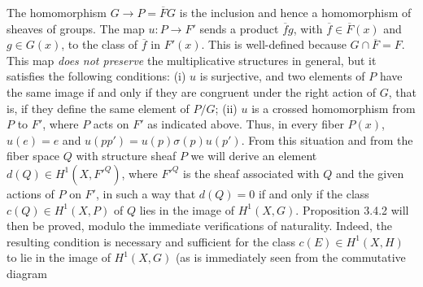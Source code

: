 The homomorphism $G\to P=\overline F G$ is the inclusion and
hence a homomorphism of sheaves of groups. The map
$u:P\to F'$ sends a product $\overline f g$, with
$\overline f\in\overline F(x)$ and $g\in G(x)$, to the class of $\overline f$
in $F'(x)$. This is well-defined because $G\cap\overline F=F$.
This map \textit{does not preserve} the multiplicative structures in general,
but it satisfies the following conditions: (i) $u$ is surjective, and two
elements of $P$ have the same image if and only if they are congruent under
the right action of $G$, that is, if they define the same element of $P/G$;
(ii) $u$ is a crossed homomorphism from $P$ to $F'$, where $P$ acts on $F'$
as indicated above. Thus, in every fiber $P(x)$,
$u(e)=e$ and $u(pp')=u(p)\sigma(p)u(p')$.
From this situation and from the fiber space $Q$ with structure sheaf $P$ we
will derive an element $d(Q)\in H^1(X,{F'}^Q)$, where ${F'}^Q$ is the sheaf
associated with $Q$ and the given actions of $P$ on $F'$, in such a way that
$d(Q)=0$ if and only if the class $c(Q)\in H^1(X,P)$ of $Q$ lies in the image
of $H^1(X,G)$. Proposition 3.4.2 will then be proved, modulo the immediate
verifications of naturality.
Indeed, the resulting condition is necessary and sufficient for the class
$c(E)\in H^1(X,H)$ to lie in the image of $H^1(X,G)$ (as is immediately seen
from the commutative diagram

